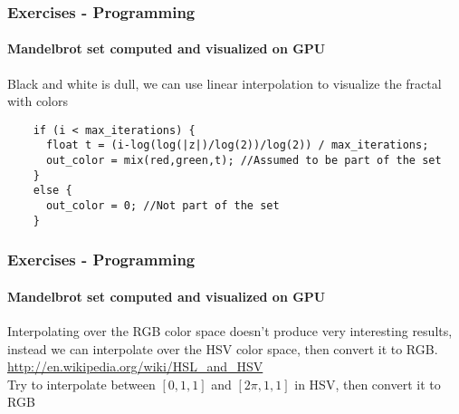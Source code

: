\documentclass[8pt]{beamer}
\begin{document}
	\begin{frame}[fragile]
	\frametitle{Exercises - Programming}
	\framesubtitle{Mandelbrot set computed and visualized on GPU}
	Black and white is dull, we can use linear interpolation to visualize the fractal with colors
	\begin{lstlisting}
	if (i < max_iterations) {
	  float t = (i-log(log(|z|)/log(2))/log(2)) / max_iterations;
	  out_color = mix(red,green,t); //Assumed to be part of the set
	}
	else {
	  out_color = 0; //Not part of the set
	}	
	\end{lstlisting}
	\end{frame}
	
	\begin{frame}[fragile]
	\frametitle{Exercises - Programming}
	\framesubtitle{Mandelbrot set computed and visualized on GPU}
	Interpolating over the RGB color space doesn't produce very interesting results, instead we can interpolate over the HSV color space, then convert it to RGB.
	\url{http://en.wikipedia.org/wiki/HSL_and_HSV}\\ \bigskip
	Try to interpolate between $[0,1,1]$ and $[2\pi,1,1]$ in HSV, then convert it to RGB
	\end{frame}
\end{document}
